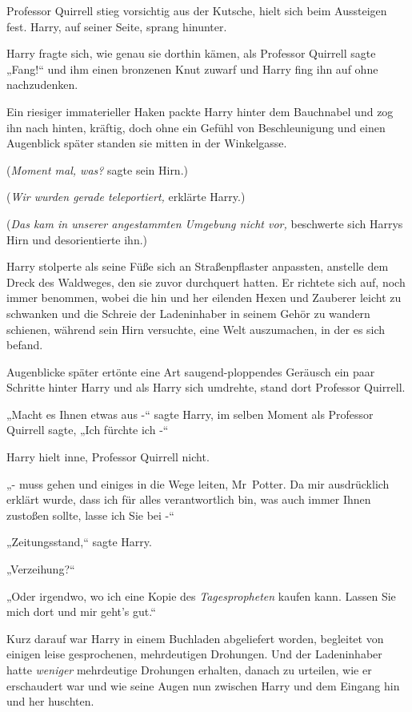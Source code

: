 {Professor Quirrell stieg vorsichtig aus der Kutsche, hielt sich beim Aussteigen fest. Harry, auf seiner Seite, sprang hinunter.

Harry fragte sich, wie genau sie dorthin kämen, als Professor Quirrell sagte „Fang!“ und ihm einen bronzenen Knut zuwarf und Harry fing ihn auf ohne nachzudenken.

Ein riesiger immaterieller Haken packte Harry hinter dem Bauchnabel und zog ihn nach hinten, kräftig, doch ohne ein Gefühl von Beschleunigung und einen Augenblick später standen sie mitten in der Winkelgasse.

(\emph{Moment mal, was?} sagte sein Hirn.)

(\emph{Wir wurden gerade teleportiert,} erklärte Harry.)

(\emph{Das kam in unserer angestammten Umgebung nicht vor,} beschwerte sich Harrys Hirn und desorientierte ihn.)

Harry stolperte als seine Füße sich an Straßenpflaster anpassten, anstelle dem Dreck des Waldweges, den sie zuvor durchquert hatten. Er richtete sich auf, noch immer benommen, wobei die hin und her eilenden Hexen und Zauberer leicht zu schwanken und die Schreie der Ladeninhaber in seinem Gehör zu wandern schienen, während sein Hirn versuchte, eine Welt auszumachen, in der es sich befand.

Augenblicke später ertönte eine Art saugend-ploppendes Geräusch ein paar Schritte hinter Harry und als Harry sich umdrehte, stand dort Professor Quirrell.

„Macht es Ihnen etwas aus -“ sagte Harry, im selben Moment als Professor Quirrell sagte, „Ich fürchte ich -“

Harry hielt inne, Professor Quirrell nicht.

„- muss gehen und einiges in die Wege leiten, Mr~Potter. Da mir ausdrücklich erklärt wurde, dass ich für alles verantwortlich bin, was auch immer Ihnen zustoßen sollte, lasse ich Sie bei -“

„Zeitungsstand,“ sagte Harry.

„Verzeihung?“

„Oder irgendwo, wo ich eine Kopie des \emph{Tagespropheten} kaufen kann. Lassen Sie mich dort und mir geht's gut.“

Kurz darauf war Harry in einem Buchladen abgeliefert worden, begleitet von einigen leise gesprochenen, mehrdeutigen Drohungen. Und der Ladeninhaber hatte \emph{weniger} mehrdeutige Drohungen erhalten, danach zu urteilen, wie er erschaudert war und wie seine Augen nun zwischen Harry und dem Eingang hin und her huschten.

}
